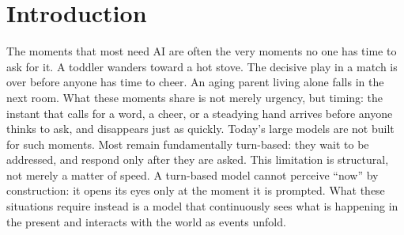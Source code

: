 \documentclass{llmxive}
\begin{document}
\section{Introduction}
\label{sec:introduction}
The moments that most need AI are often the very moments no one has time to ask for it. 
A toddler wanders toward a hot stove. The decisive play in a match is over before anyone has time to cheer. An aging parent living alone falls in the next room. What these moments share is not merely urgency, but timing: the instant that calls for a word, a cheer, or a steadying hand arrives before anyone thinks to ask, and disappears just as quickly.
Today’s large models are not built for such moments. Most remain fundamentally turn-based: they wait to be addressed, and respond only after they are asked.
This limitation is structural, not merely a matter of speed. A turn-based model cannot perceive ``now'' by construction: it opens its eyes only at the moment it is prompted. What these situations require instead is a model that continuously sees what is happening in the present and interacts with the world as events unfold.

\end{document}
